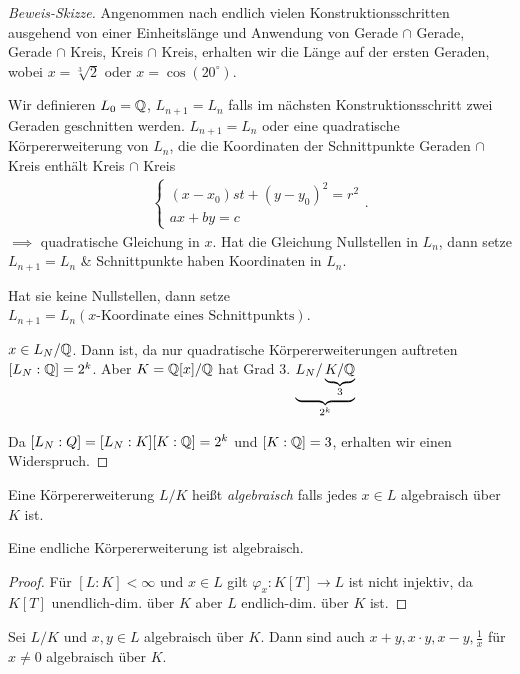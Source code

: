 \begin{proof}[Beweis-Skizze]
	Angenommen nach endlich vielen Konstruktionsschritten ausgehend von einer Einheitslänge und Anwendung von
	Gerade $\cap$ Gerade, Gerade $\cap $ Kreis, Kreis $\cap $ Kreis, erhalten wir die Länge auf der ersten Geraden, wobei $x = \sqrt[3]{2}$ oder $x = \cos(20^{\circ})$.

	Wir definieren $L_0 = \mathbb{Q}$, $L_{n+1} = L_{n}$ falls im nächsten Konstruktionsschritt zwei Geraden geschnitten werden.
	$L_{n+1} = L_{n}$ oder eine quadratische Körpererweiterung von $L_{n}$, die die Koordinaten der Schnittpunkte Geraden $\cap$ Kreis enthält Kreis $\cap$ Kreis
	\begin{align*}
		\begin{cases}
			(x-x_0)st + (y-y_0)^2 = r^2\\
			a x + b y = c
		\end{cases}
	.\end{align*}
	$\implies$ quadratische Gleichung in $x$. Hat die Gleichung Nullstellen in $L_{n}$, 
	dann setze $L_{n+1} = L_{n}$ \& Schnittpunkte haben Koordinaten in $L_{n}$.

	Hat sie keine Nullstellen, dann setze $L_{n+1} = L_{n}(x\text{-Koordinate eines Schnittpunkts})$.

	$x \in L_{N} / \mathbb{Q}$. Dann ist, da nur quadratische Körpererweiterungen auftreten $[L_{N} : \mathbb{Q}] = 2^{k}$.
	Aber $K =\mathbb{Q}[x]/\mathbb{Q}$ hat Grad $3$. $\underbrace{L_{N} / \underbrace{K / \mathbb{Q}}_{3}}_{2^{k}}$

	Da $[L_{N} : Q] = [L_{N} : K] [K : \mathbb{Q}] = 2^{k}$ und $[K:\mathbb{Q}] = 3$, erhalten wir einen Widerspruch.
\end{proof}

\begin{definition}
	Eine Körpererweiterung $L / K$ heißt \emph{algebraisch} falls jedes $x \in L$ algebraisch über $K$ ist.
\end{definition}

\begin{lemma}
	Eine endliche Körpererweiterung ist algebraisch.
\end{lemma}

\begin{proof}
	Für $[L:K] < \infty$ und $x \in L$ gilt $\varphi_{x}: K[T] \to L$ ist nicht injektiv, da $K[T]$ unendlich-dim. über $K$ aber $L$ endlich-dim. über $K$ ist.
\end{proof}

\begin{corollary}
	Sei $L / K$ und $x,y \in L$ algebraisch über $K$. Dann sind auch $x+y, x\cdot y, x-y, \frac{1}{x}$ für $x\neq 0$ algebraisch über $K$.
\end{corollary}

